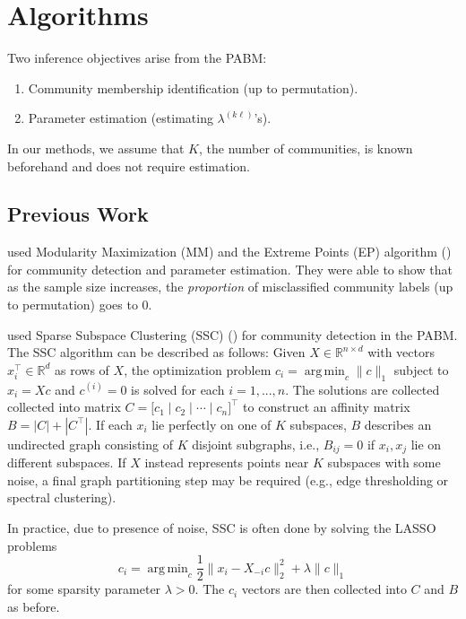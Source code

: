 \documentclass[12pt]{article}
\DeclareMathOperator*{\argmin}{arg\,min}
\providecommand{\tightlist}{%
  \setlength{\itemsep}{0pt}\setlength{\parskip}{0pt}}
\begin{document}
\hypertarget{methods}{%
\section{Algorithms}\label{methods}}

Two inference objectives arise from the PABM:

\begin{enumerate}
\def\labelenumi{\arabic{enumi}.}
\tightlist
\item
  Community membership identification (up to permutation).
\item
  Parameter estimation (estimating \(\lambda^{(k \ell)}\)'s).
\end{enumerate}

In our methods, we assume that \(K\), the number of communities, is
known beforehand and does not require estimation.

\hypertarget{related-work}{%
\subsection{Previous Work}\label{related-work}}

\citet{307cbeb9b1be48299388437423d94bf1} 
used Modularity Maximization (MM) and the Extreme Points (EP)
algorithm (\cite{le2016}) for community detection and parameter
estimation. They were able to show that as the sample size increases,
the {\em proportion} of misclassified community labels (up to permutation)
goes to 0.

\citet{noroozi2019estimation} used Sparse Subspace Clustering (SSC) 
(\cite{5206547}) for community detection in the PABM. 
The SSC algorithm can be described as follows: 
Given \(X \in \mathbb{R}^{n \times d}\) with vectors
\(x_i^\top \in \mathbb{R}^d\) as rows of \(X\), the optimization problem
\(c_i = \argmin_{c} \|c\|_1\) subject to \(x_i = X c\) and
\(c^{(i)} = 0\) is solved for each \(i = 1, ..., n\). The solutions are
collected collected into matrix
\(C = \bigl[ c_1 \mid c_2 \mid \cdots \mid c_n \bigr]^\top\) to
construct an affinity matrix \(B = |C| + |C^\top|\). If each \(x_i\) lie
perfectly on one of \(K\) subspaces, \(B\) describes an undirected graph
consisting of \(K\) disjoint subgraphs, i.e., \(B_{ij} = 0\) if
\(x_i, x_j\) lie on different subspaces. If \(X\) instead represents
points near \(K\) subspaces with some noise, a final graph partitioning
step may be required (e.g., edge thresholding or spectral clustering).

In practice, due to presence of noise, SSC is often done by solving the LASSO problems
\begin{equation} \label{eq:ssc}
c_i = \argmin_c \frac{1}{2} \|x_i - X_{-i} c\|^2_2 + \lambda \|c\|_1
\end{equation}
for some sparsity parameter \(\lambda > 0\). The \(c_i\) vectors are
then collected into \(C\) and \(B\) as before.
\end{document}
